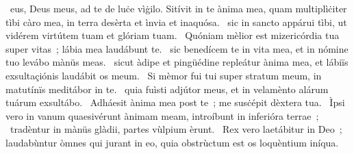 \psalmChapterWithInscription{}
{ }
{%
~eus, Deus meus, ad te de luċe vìġilo. Sitívit in te ànima mea, quam multiplìċiter tìbi càro mea, in terra desèrta et ìnvia et inaquósa. 
~sic in sancto appárui tìbi, ut vidérem virtútem tuam et glóriam tuam. 
~Quóniam mèlior est mizericórdia tua super vitas~; lábia mea laudábunt te. 
~sic benedícem te in vita mea, et in nómine tuo levábo mànüs meas. 
~sicut àdipe et pingüédine repleátur ànima mea, et lábiïs exsultaçiónis laudábit os meum. 
~Si mèmor fui tui super stratum meum, in matutínïs meditábor in te. 
~quia fuìsti adjútor meus, et in velamènto alárum tuárum exsultábo. 
~Adháesit ànima mea post te~; me susċépit dèxtera tua. 
~Ìpsi vero in vanum quaesivérunt ànimam meam, introíbunt in inferióra terrae~; 
~tradèntur in mànüs glàdii, partes vùlpium èrunt. 
~Rex vero laetábitur in Deo~; laudabùntur òmnes qui jurant in eo, quia obstrùctum est os loquèntium iníqua. 
}
